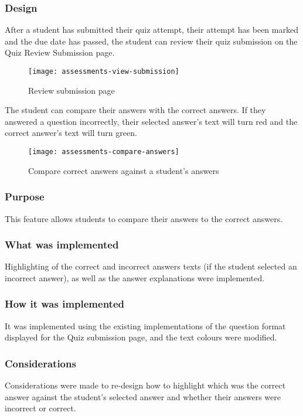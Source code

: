 \subsubsection{Design}
After a student has submitted their quiz attempt, their attempt has been marked and the due date has passed, the student can review their quiz submission on the Quiz Review Submission page.

\begin{figure}[h!]
	\centering
	\texttt{[image: assessments-view-submission]}
	\caption{Review submission page}
\end{figure}

The student can compare their answers with the correct answers. If they answered a question incorrectly, their selected answer's text will turn red and the correct answer's text will turn green.

\begin{figure}[h!]
	\centering
	\texttt{[image: assessments-compare-answers]}
	\caption{Compare correct answers against a student's answers}
\end{figure}

\subsubsection{Purpose}
This feature allows students to compare their answers to the correct answers.

\subsubsection{What was implemented}
Highlighting of the correct and incorrect answers texts (if the student selected an incorrect answer), as well as the answer explanations were implemented.

\subsubsection{How it was implemented}
It was implemented using the existing implementations of the question format displayed for the Quiz submission page, and the text colours were modified. 

\subsubsection{Considerations}
Considerations were made to re-design how to highlight which was the correct answer against the student's selected answer and whether their answers were incorrect or correct.

